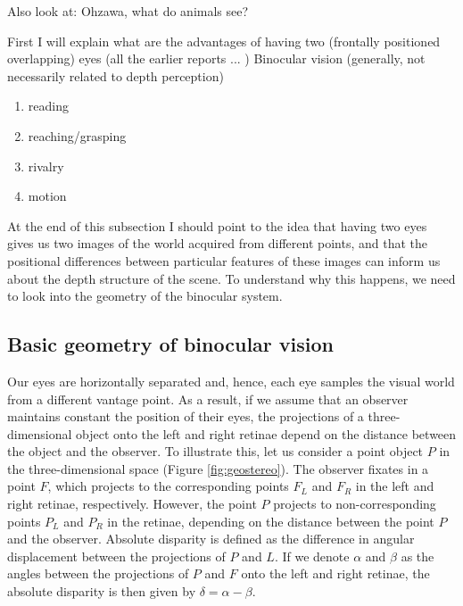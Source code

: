 \documentclass[oneside,12pt]{classes/CUEDthesisPSnPDF}
\begin{document}
Also look at: Ohzawa, what do animals see?

First I will explain what are the advantages of having two (frontally positioned overlapping) eyes (all the earlier reports ... )
Binocular vision (generally, not necessarily related to depth perception)

\begin{enumerate}
\item reading 
\item reaching/grasping 
\item rivalry
\item motion
\end{enumerate}

At the end of this subsection I should point to the idea that having two eyes gives us two images of the world acquired from different points, and that the positional differences between particular features of these images can inform us about the depth structure of the scene. To understand why this happens, we need to look into the geometry of the binocular system. 

\subsection{Basic geometry of binocular vision}\label{sec:basic-geom-binoc}

Our eyes are horizontally separated and, hence, each eye samples the visual world from a different vantage point. As a result, if we assume that an observer maintains constant the position of their eyes, the projections of a three-dimensional object onto the left and right retinae depend on the distance between the object and the observer. To illustrate this, let us consider a point object $P$ in the three-dimensional space (Figure \ref{fig:geostereo}). The observer fixates in a point $F$, which projects to the corresponding points $F_{L}$ and $F_{R}$ in the left and right retinae, respectively. However, the point $P$ projects to non-corresponding points $P_{L}$ and $P_{R}$  in the retinae, depending on the distance between the point $P$ and the observer. Absolute disparity is defined as the difference in angular displacement between the projections of $P$ and $L$. If we denote $\alpha$ and $\beta$ as the angles between the projections of $P$ and $F$ onto the left and right retinae, the absolute disparity is then given by $\delta = \alpha - \beta$.
\end{document}
